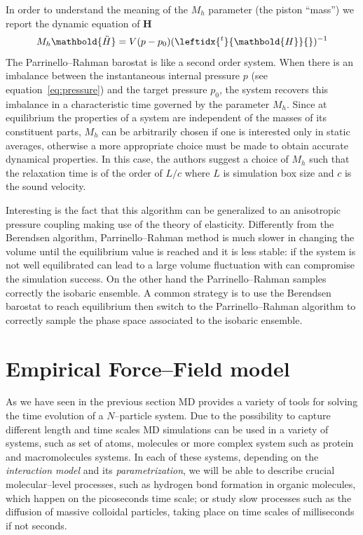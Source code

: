 In order to understand the meaning of the $M_h$ parameter (the piston ``mass'') we report the dynamic equation of $\mathbold H$
\begin{equation*}
	M_h \mathbold{\ddot H} = V (p - p_0) (\leftidx{^t}{\mathbold{H}}{})^{-1}
\end{equation*}
The Parrinello--Rahman barostat is like a second order system. When there is an imbalance between the 
instantaneous internal pressure $p$ (see equation~\eqref{eq:pressure}) and the target pressure $p_0$, the system 
recovers this imbalance in a characteristic time governed by the parameter $M_h$. Since at equilibrium the 
properties of a system are independent of the masses of its constituent parts, $M_h$ can be arbitrarily chosen if 
one is interested only in static averages, otherwise a more appropriate choice must be made to obtain accurate 
dynamical properties. In this case, the authors suggest a choice of $M_h$ such that the relaxation time is of the 
order of $L/c$ where $L$ is simulation box size and $c$ is the sound velocity. 

Interesting is the fact that this algorithm can be generalized to an anisotropic pressure coupling making use of 
the theory of elasticity. Differently from the Berendsen algorithm, Parrinello--Rahman method is much slower in 
changing the volume until the equilibrium value is reached and it is less stable: if the system is not well 
equilibrated can lead to a large volume fluctuation with can compromise the simulation success. On the other hand 
the Parrinello--Rahman samples correctly the isobaric ensemble. A common strategy is to use the Berendsen 
barostat to reach equilibrium then switch to the Parrinello--Rahman algorithm to correctly sample the phase space 
associated to the isobaric ensemble.

\section{Empirical Force--Field model}
\label{sec:EmpiricalFF}
As we have seen in the previous section \ac{MD} provides a variety of tools for solving the time evolution of a 
$N$--particle system. Due to the possibility to capture different length and time scales \ac{MD} simulations can 
be used in a variety of systems, such as set of atoms, molecules or more complex system such as protein and 
macromolecules systems. In each of these systems, depending on the \textit{interaction model} and its 
\textit{parametrization}, we will be able to describe crucial molecular--level processes, such as hydrogen bond 
formation in organic molecules, which happen on the picoseconds time scale; or study slow processes such as the 
diffusion of massive colloidal particles, taking place on time scales of milliseconds if not seconds.

